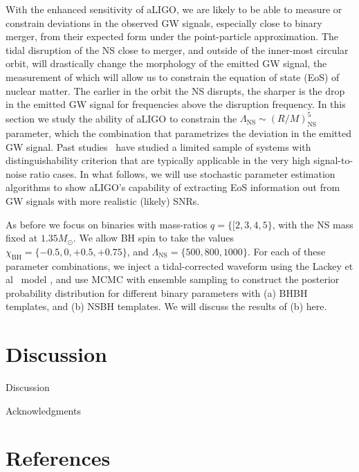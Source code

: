 \documentclass[aps,prd,amsmath,floats,floatfix, twocolumn,
superscriptaddress,nofootinbib,showpacs]{revtex4-1}
\newcommand{\lambdans}{\Lambda_\mathrm{NS}}
\newcommand{\chibh}{\chi_\mathrm{BH}}
\begin{document}
With the enhanced sensitivity of aLIGO, we are likely to be able to measure or
constrain deviations in the observed GW signals, especially close to binary
merger, from their expected form under the point-particle approximation.
The tidal disruption of the NS close to merger, and outside of the 
inner-most circular orbit, will drastically change the morphology of the emitted
GW signal, the measurement of which will allow us to constrain the equation 
of state (EoS) of nuclear matter.
The earlier in the orbit the NS disrupts, the sharper is the drop in the emitted
GW signal for frequencies above the disruption frequency. In this section we
study the ability of aLIGO to constrain the 
$\lambdans\sim \left(R/M\right)_\mathrm{NS}^5$ parameter, which
the combination that parametrizes the deviation in the emitted GW signal.
Past studies~\cite{}
have studied a limited sample of systems with distinguishability criterion that
are typically applicable in the very high signal-to-noise ratio cases. 
In what follows, we will use stochastic parameter estimation algorithms to show
aLIGO's capability of extracting EoS information out from GW signals with 
more realistic (likely) SNRs.

As before we focus on binaries with mass-ratios $q=\{[2,3,4,5\}$, with the NS mass
fixed at $1.35M_\odot$. We allow BH spin to take the values 
$\chibh=\{-0.5,0,+0.5,+0.75\}$, and $\lambdans=\{500, 800, 1000\}$. For each of these
parameter combinations, we inject a tidal-corrected waveform using the 
Lackey et al~\cite{} model , and use MCMC with ensemble sampling to construct the 
posterior probability distribution for different binary parameters with (a) BHBH
templates, and (b) NSBH templates. We will discuss the results of (b) here.


















\section{Discussion}
Discussion

\begin{acknowledgments}
Acknowledgments
\end{acknowledgments}

\section*{References}

\end{document}
